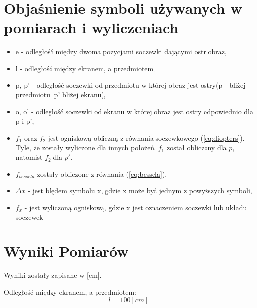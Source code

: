 \documentclass{article}
\begin{document}
\section*{Objaśnienie symboli używanych w pomiarach i wyliczeniach}
\begin{itemize}
    \item e - odległość między dwoma pozycjami soczewki dającymi ostr obraz, 
    \item l - odległość między ekranem, a przedmiotem, 
    \item p, p' - odległość soczewki od przedmiotu w której obraz jest ostry(p - bliżej przedmiotu, p' bliżej ekranu), 
    \item o, o' - odległość soczewki od ekranu w której obraz jest ostry odpowiednio dla p i p', 
    \item $f_1$ oraz $f_2$ jest ogniskową obliczną z równania soczewkowego (\ref{eq:diopters}). Tyle, że zostały wyliczone dla innych położeń. $f_1$ został obliczony dla $p$, natomist $f_2$ dla $p'$.
    \item $f_{bessela}$ zostały obliczone z równania (\ref{eq:bessela}). 
    \item $\Delta x$ - jest błędem symbolu x, gdzie x może być jednym z powyższych symboli,
    \item $f_x$ - jest wyliczoną ogniskową, gdzie x jest oznaczeniem soczewki lub układu soczewek
    
\end{itemize}


\section*{Wyniki Pomiarów}

Wyniki zostały zapisane w [cm]. 


Odległość między ekranem, a przedmiotem: 
\[l = 100[cm] \nonumber\]
\end{document}
